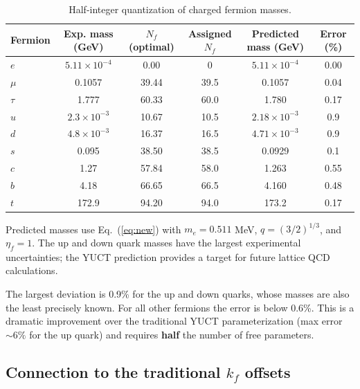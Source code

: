 \documentclass[12pt,a4paper]{article}
\begin{document}
	\begin{table}[H]
		\centering
		\caption{Half-integer quantization of charged fermion masses.}
		\label{tab:new_masses}
		\small
		\begin{tabular}{l c c c c c}
			\toprule
			Fermion & Exp. mass (GeV) & \(N_f\) (optimal) & Assigned \(N_f\) & Predicted mass (GeV) & Error (\%) \\
			\midrule
			\(e\)   & \(5.11\times10^{-4}\) & 0.00  & 0      & \(5.11\times10^{-4}\) & 0.00 \\
			\(\mu\)  & 0.1057                & 39.44 & 39.5   & 0.1057               & 0.04 \\
			\(\tau\) & 1.777                 & 60.33 & 60.0   & 1.780                & 0.17 \\
			\(u\)   & \(2.3\times10^{-3}\)    & 10.67 & 10.5   & \(2.18\times10^{-3}\)  & 0.9 \\
			\(d\)   & \(4.8\times10^{-3}\)    & 16.37 & 16.5   & \(4.71\times10^{-3}\)  & 0.9 \\
			\(s\)   & 0.095                 & 38.50 & 38.5   & 0.0929               & 0.1 \\
			\(c\)   & 1.27                  & 57.84 & 58.0   & 1.263                & 0.55 \\
			\(b\)   & 4.18                  & 66.65 & 66.5   & 4.160                & 0.48 \\
			\(t\)   & 172.9                 & 94.20 & 94.0   & 173.2                & 0.17 \\
			\bottomrule
		\end{tabular}
		\par\smallskip
		\footnotesize Predicted masses use Eq.~(\ref{eq:new}) with \(m_e = 0.511\) MeV, \(q = (3/2)^{1/3}\), and \(\eta_f = 1\). The up and down quark masses have the largest experimental uncertainties; the YUCT prediction provides a target for future lattice QCD calculations.
	\end{table}
	
	The largest deviation is 0.9\% for the up and down quarks, whose masses are also the least precisely known. For all other fermions the error is below 0.6\%. This is a dramatic improvement over the traditional YUCT parameterization (max error \(\sim 6\%\) for the up quark) and requires \textbf{half} the number of free parameters.
	
	\subsection{Connection to the traditional \(k_f\) offsets}
	
\end{document}
